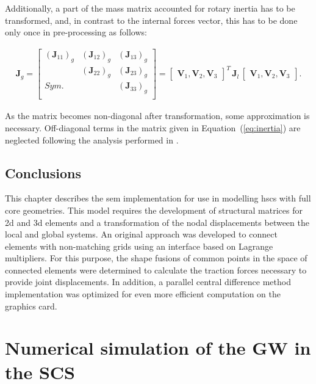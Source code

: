 \documentclass[11pt,a4paper,final]{report}
\begin{document}
Additionally, a part of the mass matrix accounted for rotary inertia has to be transformed, and, in contrast to the internal forces vector, this has to be done only once in pre-processing as follows:

\begin{eqnarray}
	\textbf{J}_g=\left [ 
	\begin{array}{ccc}
		\left (\textbf{J}_{11}\right )_g & \left (\textbf{J}_{12}\right )_g & \left (\textbf{J}_{13}\right )_g\\
		& \left (\textbf{J}_{22}\right )_g & \left (\textbf{J}_{23}\right )_g\\
		Sym. &  & \left (\textbf{J}_{33}\right )_g\\
	\end{array}
	\right ]
	=\left[\begin{array}{ccc}
		\textbf{V}_1, \textbf{V}_2, \textbf{V}_3 \end{array}\right ]^T
	\,\textbf{J}_l\,
	\left[\begin{array}{ccc}
		\textbf{V}_1, \textbf{V}_2, \textbf{V}_3 \end{array}\right ].
	\label{eq:inertia}
\end{eqnarray}

As the matrix becomes non-diagonal after transformation, some approximation is necessary.
Off-diagonal terms in the matrix given in Equation~(\ref{eq:inertia}) are neglected following the analysis performed in \cite{surana1980transition}. \section{Conclusions}
\label{sec:conclusionsSEM}
This chapter describes the \ac{sem} implementation for use in modelling \acp{hsc} with full core geometries.
This model requires the development of structural matrices for \ac{2d} and \ac{3d} elements and a transformation of the nodal displacements between the local and global systems.
An original approach was developed to connect elements with non-matching grids using an interface based on Lagrange multipliers.
For this purpose, the shape fusions of common points in the space of connected elements were determined to calculate the traction forces necessary to provide joint displacements.
In addition, a parallel central difference method implementation was optimized for even more efficient computation on the graphics card.
 \clearpage{}
\clearpage{}

\chapter[Numerical simulation of the GW in the SCS]{Numerical simulation of the GW in the SCS}
\label{ch:simulation}
\end{document}
